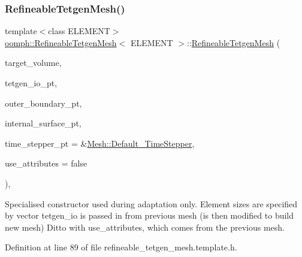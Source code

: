 \subsubsection{\texorpdfstring{Refineable\+Tetgen\+Mesh()}{RefineableTetgenMesh()}\hspace{0.1cm}{\footnotesize\ttfamily [2/2]}}
{\footnotesize\ttfamily template$<$class E\+L\+E\+M\+E\+NT$>$ \\
\hyperlink{classoomph_1_1RefineableTetgenMesh}{oomph\+::\+Refineable\+Tetgen\+Mesh}$<$ E\+L\+E\+M\+E\+NT $>$\+::\hyperlink{classoomph_1_1RefineableTetgenMesh}{Refineable\+Tetgen\+Mesh} (\begin{DoxyParamCaption}\item[{const \hyperlink{classoomph_1_1Vector}{Vector}$<$ double $>$ \&}]{target\+\_\+volume,  }\item[{tetgenio $\ast$const \&}]{tetgen\+\_\+io\+\_\+pt,  }\item[{\hyperlink{classoomph_1_1TetMeshFacetedClosedSurface}{Tet\+Mesh\+Faceted\+Closed\+Surface} $\ast$const \&}]{outer\+\_\+boundary\+\_\+pt,  }\item[{\hyperlink{classoomph_1_1Vector}{Vector}$<$ \hyperlink{classoomph_1_1TetMeshFacetedSurface}{Tet\+Mesh\+Faceted\+Surface} $\ast$$>$ \&}]{internal\+\_\+surface\+\_\+pt,  }\item[{\hyperlink{classoomph_1_1TimeStepper}{Time\+Stepper} $\ast$}]{time\+\_\+stepper\+\_\+pt = {\ttfamily \&\hyperlink{classoomph_1_1Mesh_a12243d0fee2b1fcee729ee5a4777ea10}{Mesh\+::\+Default\+\_\+\+Time\+Stepper}},  }\item[{const bool \&}]{use\+\_\+attributes = {\ttfamily false} }\end{DoxyParamCaption})\hspace{0.3cm}{\ttfamily [inline]}, {\ttfamily [private]}}



Specialised constructor used during adaptation only. Element sizes are specified by vector tetgen\+\_\+io is passed in from previous mesh (is then modified to build new mesh) Ditto with use\+\_\+attributes, which comes from the previous mesh. 



Definition at line 89 of file refineable\+\_\+tetgen\+\_\+mesh.\+template.\+h.



